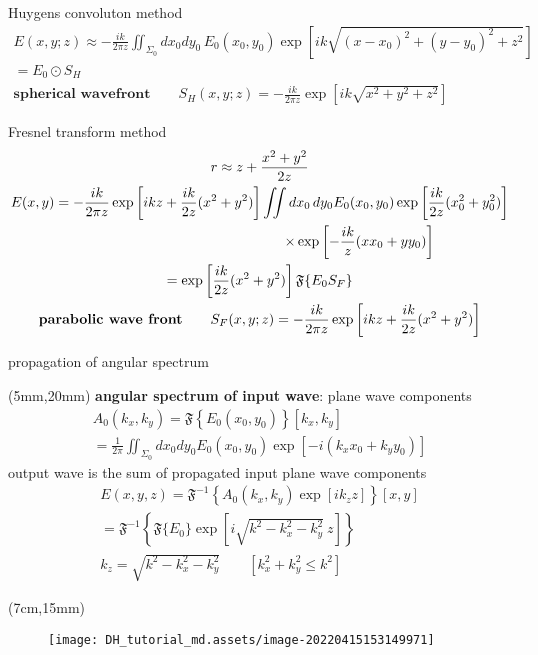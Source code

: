 \documentclass[t, aspectratio=169]{beamer}
\begin{document}
\begin{frame}{Huygens convoluton method}	
	\begin{gather*}	
E(x,y;z) \approx -\frac{ik}{2\pi z} \iint_{\Sigma_0} dx_0dy_0\,E_0(x_0,y_0)\exp\left[ik\sqrt{(x-x_0)^2 + (y-y_0)^2 + z^2 }\right] \\
= E_0 \odot S_H \\
\textbf{spherical wavefront} \qquad S_H(x,y;z) = - \frac{ik}{2\pi z} \exp\left[ik\sqrt{x^2+y^2+z^2}\right]
	\end{gather*}
\end{frame}


\begin{frame}{Fresnel transform method}	
	\begin{gather*}	
r \approx z + \frac{x^2+y^2}{2z} \\
E(x,y) = - \frac{ik}{2\pi z} \exp\left[ikz + \frac{ik}{2z} (x^2+y^2)\right] \iint dx_0\,dy_0E_0(x_0,y_0)\exp\left[\frac{ik}{2z}(x_0^2+y_0^2)\right] \\
\hspace{50mm}\times\exp\left[-\frac{ik}{z}(xx_0+yy_0)\right] \\ 
=\exp\left[\frac{ik}{2z}(x^2+y^2)\right]\mathfrak F\{E_0S_F\} \\
\textbf{parabolic wave front} \qquad S_F(x,y;z) = -\frac{ik}{2\pi z}\exp\left[ikz + \frac{ik}{2z}(x^2+y^2)\right]
	\end{gather*}
\end{frame}


\begin{frame}{propagation of angular spectrum}

	\begin{textblock*}{110mm}(5mm,20mm)
		\textbf{angular spectrum of input wave}: plane wave components
		\begin{gather*}
A_0(k_x,k_y) = \mathfrak F\left\{E_0(x_0,y_0)\right\}\left[k_x,k_y\right] \\
=\frac{1}{2\pi}\iint_{\Sigma_0} dx_0 dy_0 E_0(x_0,y_0) \exp\left[-i(k_x x_0 + k_y y_0)\right] 
		\end{gather*} 
		output wave is the sum of propagated input plane wave components
		\begin{gather*}
E(x,y,z) = \mathfrak F^{-1}\left\{A_0(k_x,k_y) \exp[ik_z z]\right\}[x,y] \\
= \mathfrak F^{-1}\left\{\mathfrak F\{E_0\}\exp\left[i\sqrt{k^2 - k_x^2 - k_y^2}\ z\right]\right\} \\
k_z = \sqrt{k^2 - k_x^2 - k_y^2} \qquad \left[ k_x^2 + k_y^2 \le k^2 \right]	
		\end{gather*}
	\end{textblock*}

	\begin{textblock*}{12cm}(7cm,15mm) %
		\begin{figure}
			\texttt{[image: DH\_tutorial\_md.assets/image-20220415153149971]}
		\end{figure}
	\end{textblock*}

\end{frame}
\end{document}
